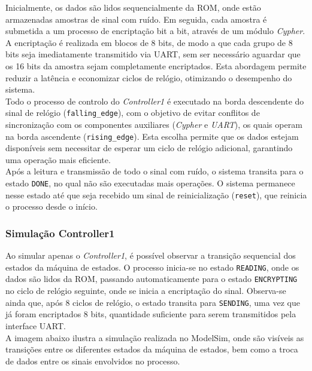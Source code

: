 \documentclass[12pt, a4paper]{article}
\begin{document}
Inicialmente, os dados são lidos sequencialmente da ROM, onde estão armazenadas amostras de sinal com ruído. Em seguida, cada amostra é submetida a um processo de encriptação bit a bit, através de um módulo \textit{Cypher}.  
A encriptação é realizada em blocos de 8 bits, de modo a que cada grupo de 8 bits seja imediatamente transmitido via UART, sem ser necessário aguardar que os 16 bits da amostra sejam completamente encriptados. Esta abordagem permite reduzir a latência e economizar ciclos de relógio, otimizando o desempenho do sistema.\\

Todo o processo de controlo do \textit{Controller1} é executado na borda descendente do sinal de relógio (\texttt{falling\_edge}), com o objetivo de evitar conflitos de sincronização com os componentes auxiliares (\textit{Cypher} e \textit{UART}), os quais operam na borda ascendente (\texttt{rising\_edge}). Esta escolha permite que os dados estejam disponíveis sem necessitar de esperar um ciclo de relógio adicional, garantindo uma operação mais eficiente.\\

Após a leitura e transmissão de todo o sinal com ruído, o sistema transita para o estado \texttt{DONE}, no qual não são executadas mais operações. O sistema permanece nesse estado até que seja recebido um sinal de reinicialização (\texttt{reset}), que reinicia o processo desde o início.

\subsubsection{Simulação Controller1}
Ao simular apenas o \textit{Controller1}, é possível observar a transição sequencial dos estados da máquina de estados.  
O processo inicia-se no estado \texttt{READING}, onde os dados são lidos da ROM, passando automaticamente para o estado \texttt{ENCRYPTING} no ciclo de relógio seguinte, onde se inicia a encriptação do sinal.  
Observa-se ainda que, após 8 ciclos de relógio, o estado transita para \texttt{SENDING}, uma vez que já foram encriptados 8 bits, quantidade suficiente para serem transmitidos pela interface UART.\\

A imagem abaixo ilustra a simulação realizada no ModelSim, onde são visíveis as transições entre os diferentes estados da máquina de estados, bem como a troca de dados entre os sinais envolvidos no processo.
\end{document}
